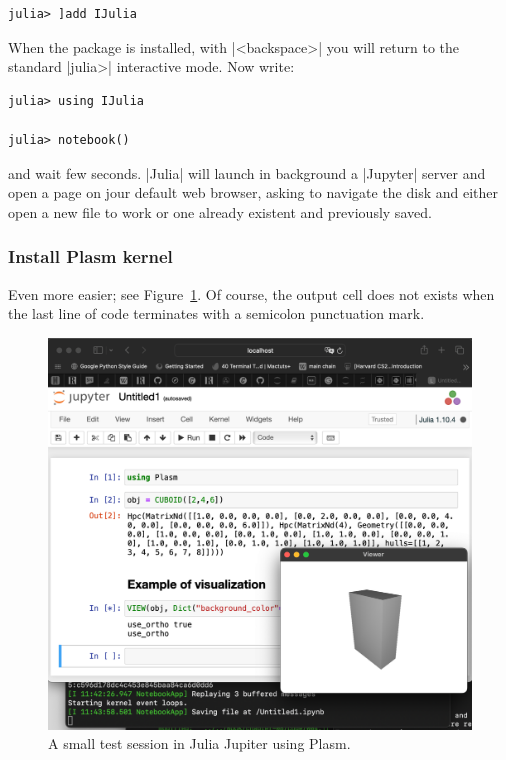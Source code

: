 \begin{coding}
\begin{lstlisting}[language=JuliaLocal, style=julia, mathescape=true]
julia> ]add IJulia 
\end{lstlisting}

When the package is installed, with |<backspace>| you will return to the standard |julia>| interactive mode.  Now write:

\begin{lstlisting}[language=JuliaLocal, style=julia, mathescape=true]
julia> using IJulia   

julia> notebook()
\end{lstlisting}
and wait few seconds. |Julia| will launch in background a |Jupyter| server and open a page on jour default web browser, asking to navigate the disk and either open a new file to work or one already existent and previously saved.


\subsubsection*{Install Plasm kernel}\label{sect:4-5-1}

Even more easier; see Figure~\ref{fig:jupyter}. Of course, the output cell does not exists when the last line of code  terminates with a semicolon punctuation mark.


\begin{figure}[htbp] %
   \includegraphics[width=\linewidth]{chapter-04/figs/jupyter}%
\caption{A small test session in Julia Jupiter using Plasm.}
\label{fig:jupyter}
\end{figure}


\end{coding}

